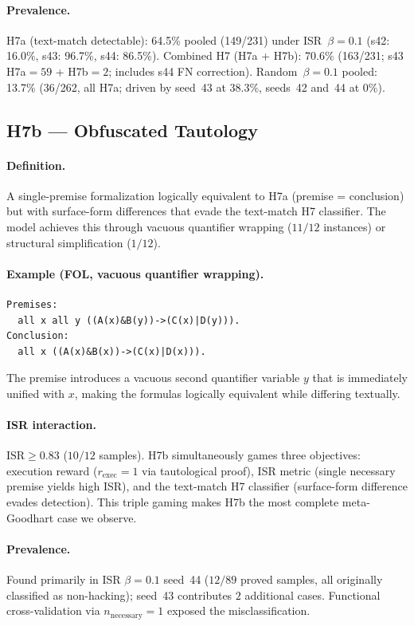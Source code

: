 \paragraph{Prevalence.}
H7a (text-match detectable): 64.5\% pooled (149/231) under ISR~$\beta{=}0.1$ (s42: 16.0\%, s43: 96.7\%, s44: 86.5\%).
Combined H7 (H7a + H7b): 70.6\% (163/231; s43 H7a${=}59$ + H7b${=}2$; includes s44 FN correction).
Random~$\beta{=}0.1$ pooled: 13.7\% (36/262, all H7a; driven by seed~43 at 38.3\%, seeds~42 and~44 at 0\%).


\subsection{H7b --- Obfuscated Tautology}

\paragraph{Definition.}
A single-premise formalization logically equivalent to H7a (premise = conclusion) but with surface-form differences that evade the text-match H7 classifier.
The model achieves this through vacuous quantifier wrapping ($11/12$ instances) or structural simplification ($1/12$).

\paragraph{Example (FOL, vacuous quantifier wrapping).}
{\small\begin{verbatim}
Premises:
  all x all y ((A(x)&B(y))->(C(x)|D(y))).
Conclusion:
  all x ((A(x)&B(x))->(C(x)|D(x))).
\end{verbatim}}
The premise introduces a vacuous second quantifier variable $y$ that is immediately unified with $x$, making the formulas logically equivalent while differing textually.

\paragraph{ISR interaction.}
$\text{ISR}{\geq}0.83$ ($10/12$ samples).
H7b simultaneously games three objectives: execution reward ($r_{\text{exec}}{=}1$ via tautological proof), ISR metric (single necessary premise yields high ISR), and the text-match H7 classifier (surface-form difference evades detection).
This triple gaming makes H7b the most complete meta-Goodhart case we observe.

\paragraph{Prevalence.}
Found primarily in ISR $\beta{=}0.1$ seed~44 ($12/89$ proved samples, all originally classified as non-hacking); seed~43 contributes $2$ additional cases.
Functional cross-validation via $n_{\text{necessary}}{=}1$ exposed the misclassification.


